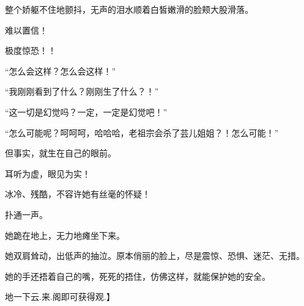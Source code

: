 \begin{this_body}
整个娇躯不住地颤抖，无声的泪水顺着白皙嫩滑的脸颊大股滑落。

难以置信！

极度惊恐！！

“怎么会这样？怎么会这样！”

“我刚刚看到了什么？刚刚生了什么？！”

“这一切是幻觉吗？一定，一定是幻觉吧！”

“怎么可能呢？呵呵呵，哈哈哈，老祖宗会杀了芸儿姐姐？！怎么可能！”

但事实，就生在自己的眼前。

耳听为虚，眼见为实！

冰冷、残酷，不容许她有丝毫的怀疑！

扑通一声。

她跪在地上，无力地瘫坐下来。

她双肩耸动，出低声的抽泣。原本俏丽的脸上，尽是震惊、恐惧、迷茫、无措。

她的手还捂着自己的嘴，死死的捂住，仿佛这样，就能保护她的安全。

地一下云.来.阁即可获得观.】

\end{this_body}

